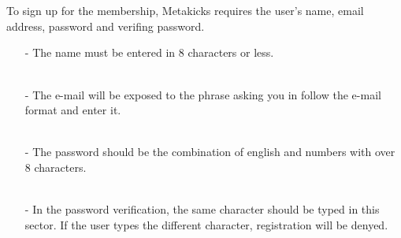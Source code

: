 \documentclass[conference]{IEEEtran}
\begin{document}
\begin{enumerate}
\\\\To sign up for the membership, Metakicks requires the user's name, email address, password and verifing password.\\
	\begin{enumerate}
		\item[-]The name must be entered in 8 characters or less.\\\\
	\end{enumerate}
	\begin{enumerate}
		\item[-]The e-mail will be exposed to the phrase asking you in follow the e-mail format and enter it.\\\\
	\end{enumerate}
	\begin{enumerate}
		\item[-]The password should be the combination of english and numbers with over 8 characters.\\\\
	\end{enumerate}
	\begin{enumerate}
		\item[-]In the password verification, the same character should be typed in this sector. If the user types the different character, registration will be denyed.\\\\
	\end{enumerate}



\end{enumerate}
\end{document}
